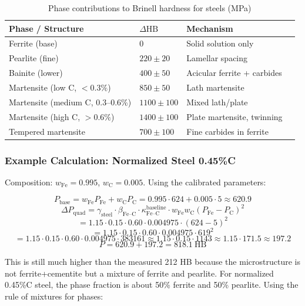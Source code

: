 \documentclass[12pt,a4paper]{article}
\begin{document}
	\begin{longtable}{p{3.5cm} p{3.0cm} p{3.0cm} p{4cm}}
		\caption{Phase contributions to Brinell hardness for steels (MPa)}\label{tab:steel_phase_contrib}\\
		\toprule
		\textbf{Phase / Structure} & $\Delta\text{HB}$ & \textbf{Mechanism} \\
		\midrule
		Ferrite (base) & 0 & Solid solution only \\
		Pearlite (fine) & $220 \pm 20$ & Lamellar spacing \\
		Bainite (lower) & $400 \pm 50$ & Acicular ferrite + carbides \\
		Martensite (low C, $<0.3\%$) & $850 \pm 50$ & Lath martensite \\
		Martensite (medium C, 0.3–0.6\%) & $1100 \pm 100$ & Mixed lath/plate \\
		Martensite (high C, $>0.6\%$) & $1400 \pm 100$ & Plate martensite, twinning \\
		Tempered martensite & $700 \pm 100$ & Fine carbides in ferrite \\
		\bottomrule
	\end{longtable}
	
	\subsubsection{Example Calculation: Normalized Steel 0.45\%C}
	
	Composition: $w_{\text{Fe}} = 0.995$, $w_{\text{C}} = 0.005$. Using the calibrated parameters:
	
	\[
	P_{\text{base}} = w_{\text{Fe}} P_{\text{Fe}} + w_{\text{C}} P_{\text{C}} = 0.995\cdot624 + 0.005\cdot5 \approx 620.9
	\]
	\[
	\Delta P_{\text{quad}} = \gamma_{\text{steel}} \cdot \beta_{\text{Fe–C}} \cdot \kappa_{\text{Fe–C}}^{\text{baseline}} \cdot w_{\text{Fe}} w_{\text{C}} (P_{\text{Fe}}-P_{\text{C}})^2
	\]
	\[
	= 1.15 \cdot 0.15 \cdot 0.60 \cdot 0.004975 \cdot (624-5)^2
	\]
	\[
	= 1.15 \cdot 0.15 \cdot 0.60 \cdot 0.004975 \cdot 619^2
	\]
	\[
	= 1.15 \cdot 0.15 \cdot 0.60 \cdot 0.004975 \cdot 383161 \approx 1.15 \cdot 0.15 \cdot 1143 \approx 1.15 \cdot 171.5 \approx 197.2
	\]
	\[
	P = 620.9 + 197.2 = 818.1\ \text{HB}
	\]
	
	This is still much higher than the measured 212 HB because the microstructure is not ferrite+cementite but a mixture of ferrite and pearlite. For normalized 0.45\%C steel, the phase fraction is about 50\% ferrite and 50\% pearlite. Using the rule of mixtures for phases:
	
\end{document}
